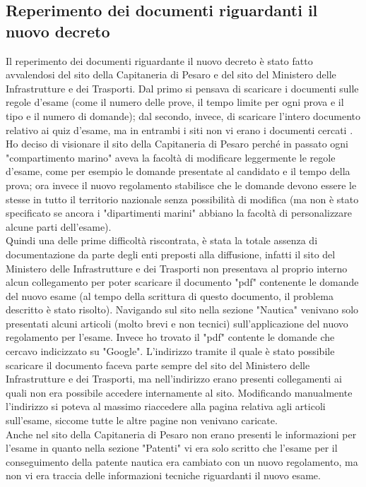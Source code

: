 \subsection{Reperimento dei documenti riguardanti il nuovo decreto}
Il reperimento dei documenti riguardante il nuovo decreto è stato fatto avvalendosi del sito della Capitaneria di Pesaro e del sito del Ministero delle Infrastrutture e dei Trasporti. Dal primo si pensava di scaricare i documenti sulle regole d'esame (come il numero delle prove, il tempo limite per ogni prova e il tipo e il numero di domande); dal secondo, invece,  di scaricare l'intero documento relativo ai quiz d'esame, ma in entrambi i siti non vi erano i documenti cercati . Ho deciso di visionare il sito della Capitaneria di Pesaro perché in passato ogni "compartimento marino" aveva la facoltà di modificare leggermente le regole d'esame, come per esempio le domande presentate al candidato e il tempo della prova; ora invece  il nuovo regolamento stabilisce che le domande devono essere le stesse in tutto il territorio nazionale senza possibilità di modifica (ma non è stato specificato se ancora i "dipartimenti marini" abbiano la facoltà di personalizzare alcune parti dell'esame).\\
Quindi una delle prime difficoltà riscontrata, è stata la totale assenza di documentazione da parte degli enti preposti alla diffusione, infatti  il sito del Ministero delle Infrastrutture e dei Trasporti non presentava al proprio interno alcun collegamento per poter scaricare il documento "pdf" contenente le domande del nuovo esame (al tempo della scrittura di questo documento, il problema descritto è stato risolto). Navigando sul sito nella sezione "Nautica" venivano solo presentati alcuni articoli (molto brevi e non tecnici)  sull'applicazione del nuovo regolamento per l'esame. Invece ho trovato il "pdf" contente le domande che cercavo indicizzato su "Google". L'indirizzo  tramite il quale è stato possibile scaricare il documento faceva parte sempre del sito del Ministero delle Infrastrutture e dei Trasporti, ma nell'indirizzo erano presenti collegamenti ai quali non era possibile accedere internamente al sito. Modificando manualmente l'indirizzo  si poteva al massimo riaccedere alla pagina relativa agli articoli sull'esame, siccome tutte le altre pagine non venivano caricate.\\
Anche nel sito della Capitaneria di Pesaro non erano presenti le informazioni per l'esame in quanto nella sezione "Patenti" vi era solo scritto che l'esame per il conseguimento della patente nautica era cambiato con un nuovo regolamento, ma non vi era traccia delle informazioni tecniche riguardanti il nuovo esame.\\
